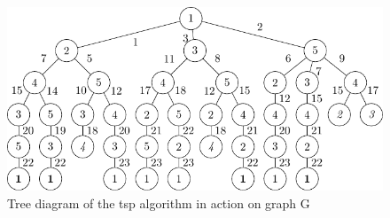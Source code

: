 \begin{figure}
\centering
\includegraphics[keepaspectratio,width=1.0\textwidth]{chapters/tsp/figs/ugraph-figure1}
\caption[A tree diagram representing all potential evolutions of the \gls{cps}  algorithm on the graph in \cref{fig:tsp:ugraph}]{\label{fig:tsp:utree}Tree diagram of the \gls{tsp} algorithm in action on graph G}
\end{figure}

\begin{cpobjectsfloat}
\begin{cpobjects}
    
    
    
    
\end{cpobjects}
\caption[Starting set of subcells from \cref{fig:tsp:utree}]{\label{objs:tsp:obj1}Set of subcells from G in the skin membrane at the initial state}
\end{cpobjectsfloat}

